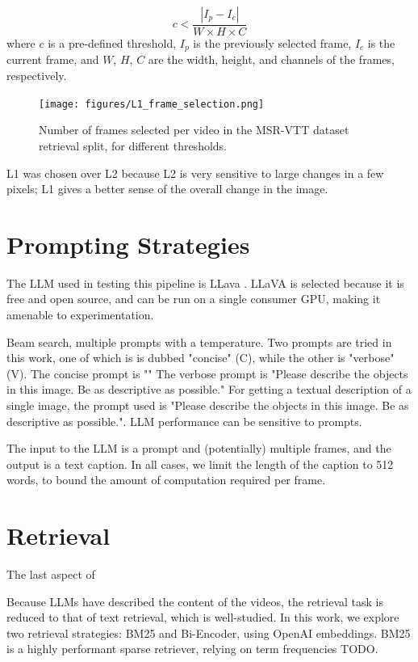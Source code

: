 \documentclass{article}
\begin{document}
\begin{equation}
      c < \frac{|I_{p} - I_{c}|}{W \times H \times C}
\end{equation}
where $c$ is a pre-defined threshold, $I_{p}$ is the previously selected frame, $I_{c}$ is the current frame, and $W$, $H$, $C$ are the width, height, and channels of the frames, respectively.

\begin{figure}
      \centering
      \texttt{[image: figures/L1\_frame\_selection.png]}
      \caption{Number of frames selected per video in the MSR-VTT dataset retrieval split, for different thresholds.}
      \label{fig:optical_flow}
\end{figure}

L1 was chosen over L2 because L2 is very sensitive to large changes in a few pixels; L1 gives a better sense of the overall change in the image.

\section{Prompting Strategies}

The LLM used in testing this pipeline is LLava \cite{llava}.
LLaVA is selected because it is free and open source, and can be run on a single consumer GPU, making it amenable to experimentation.

Beam search, multiple prompts with a temperature.
Two prompts are tried in this work, one of which is is dubbed "concise" (C), while the other is "verbose" (V).
The concise prompt is ""
The verbose prompt is "Please describe the objects in this image. Be as descriptive as possible."
For getting a textual description of a single image, the prompt used is "Please describe the objects in this image. Be as descriptive as possible.".
LLM performance can be sensitive to prompts.

The input to the LLM is a prompt and (potentially) multiple frames, and the output is a text caption.
In all cases, we limit the length of the caption to 512 words, to bound the amount of computation required per frame.

\section{Retrieval}

The last aspect of 

Because LLMs have described the content of the videos, the retrieval task is reduced to that of text retrieval, which is well-studied.
In this work, we explore two retrieval strategies: BM25 and Bi-Encoder, using OpenAI embeddings.
BM25 is a highly performant sparse retriever, relying on term frequencies TODO.
\end{document}
